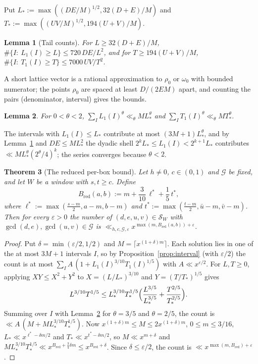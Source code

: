 \documentclass[11pt,reqno]{amsart}
\newtheorem{theorem}{Theorem}[section]
\newtheorem{lemma}[theorem]{Lemma}
\theoremstyle{definition}
\theoremstyle{remark}
\numberwithin{equation}{section}
\newcommand{\ub}{\bar u}
\newcommand{\vb}{\bar v}
\newcommand{\Bred}{B_{\mathrm{red}}}
\newcommand{\lst}{\ell^{*}}
\newcommand{\tst}{t^{*}}
\begin{document}
Put $L_*:=\max((DE/M)^{1/2},32(D+E)/M)$ and $T_*:=\max((UV/M)^{1/2},194(U+V)/M)$.

\begin{lemma}[Tail counts]\label{lem:tails}
For $L\ge32(D+E)/M$, $\#\{I:\ L_1(I)\ge L\}\le720\,DE/L^2$, and for
$T\ge194(U+V)/M$, $\#\{I:\ T_1(I)\ge T\}\le7000\,UV/T^2$.
\end{lemma}
A short lattice vector is a rational approximation to $\rho_0$ or $\omega_0$
with bounded numerator; the points $\rho_0$ are spaced at least $D/(2EM)$
apart, and counting the pairs (denominator, interval) gives the bounds.

\begin{lemma}\label{lem:moments}
For $0<\theta<2$, $\sum_I L_1(I)^{\theta}\ll_\theta M L_*^{\theta}$ and
$\sum_I T_1(I)^{\theta}\ll_\theta M T_*^{\theta}$.
\end{lemma}
The intervals with $L_1(I)\le L_*$ contribute at most $(3M+1)L_*^\theta$, and
by Lemma~\ref{lem:tails} and $DE\le ML_*^2$ the dyadic shell
$2^kL_*\le L_1(I)<2^{k+1}L_*$ contributes $\ll ML_*^\theta(2^\theta/4)^k$; the
series converges because $\theta<2$.

\begin{theorem}[The reduced per-box bound]\label{thm:Bred}
Let $h\ne0$, $c\in(0,1)$ and $\mathcal G$ be fixed, and let $W$ be a window with
$s,t\ge c$. Define
\begin{equation}\label{eq:Bred}
\Bred(a,b):=m+\frac3{10}\,\lst+\frac15\,\tst,
\end{equation}
where $\lst:=\max(\frac{s-m}2,a-m,b-m)$ and $\tst:=\max(\frac{t-m}2,\ub-m,\vb-m)$.
Then for every $\varepsilon>0$ the number of $(d,e,u,v)\in\mathcal S_W$ with
$\gcd(d,e),\gcd(u,v)\in\mathcal G$ is $\ll_{h,c,\mathcal G,\varepsilon}x^{\max(m,\Bred(a,b))+\varepsilon}$.
\end{theorem}

\begin{proof}
Put $\delta=\min(\varepsilon/2,1/2)$ and $M=\lceil x^{(1+\delta)m}\rceil$.
Each solution lies in one of the at most $3M+1$ intervals $I$, so by
Proposition~\ref{prop:interval} (with $\varepsilon/2$) the count is at most
$\sum_I A\,(1+L_1(I)^{3/10}T_1(I)^{1/5})$ with $A\ll x^{\varepsilon/2}$.
For $L,T\ge0$, applying $XY\le X^2+Y^2$ to $X=(L/L_*)^{3/10}$ and
$Y=(T/T_*)^{1/5}$ gives
\[
L^{3/10}T^{1/5}\le L_*^{3/10}T_*^{1/5}\Bigl(\frac{L^{3/5}}{L_*^{3/5}}+\frac{T^{2/5}}{T_*^{2/5}}\Bigr).
\]
Summing over $I$ with Lemma~\ref{lem:moments} for $\theta=3/5$ and
$\theta=2/5$, the count is $\ll A\,(M+ML_*^{3/10}T_*^{1/5})$. Now
$x^{(1+\delta)m}\le M\le2x^{(1+\delta)m}$, $0\le m\le3/16$,
$L_*\ll x^{\lst-\delta m/2}$ and $T_*\ll x^{\tst-\delta m/2}$, so
$M\ll x^{m+\delta}$ and
$ML_*^{3/10}T_*^{1/5}\ll x^{\Bred+\frac34\delta m}\le x^{\Bred+\delta}$. Since
$\delta\le\varepsilon/2$, the count is $\ll x^{\max(m,\Bred)+\varepsilon}$.
\end{proof}
\end{document}
